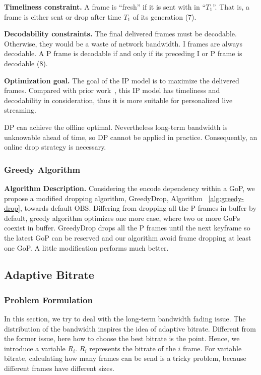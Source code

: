 \textbf{Timeliness constraint.}
A frame is ``fresh'' if it is sent with in ``$T_1$''. That is, a frame is either sent or drop after time $T_1$ of its generation (7).

\textbf{Decodability constraints.} The final delivered frames must be decodable. Otherwise, they would be a waste of network bandwidth. I frames are always decodable. A P frame is decodable if and only if its preceding I or P frame is decodable (8).

\textbf{Optimization goal.} The goal of the IP model is to maximize the delivered frames.
Compared with prior work~\cite{singh2004dynamic}, this IP model has timeliness and decodability in consideration, thus it is more suitable for personalized live streaming.

DP can achieve the offline optimal. Nevertheless long-term bandwidth is unknowable ahead of time, so DP cannot be applied in practice. Consequently, an online drop strategy is necessary.

\subsubsection{Greedy Algorithm}

\textbf{Algorithm Description.} Considering the encode dependency within a GoP, we propose a modified dropping algorithm, GreedyDrop, Algorithm ~\ref{alg:greedy-drop}, towards default OBS. Differing from dropping all the P frames in buffer by default, greedy algorithm optimizes one more case, where two or more GoPs coexist in buffer. GreedyDrop drops all the P frames until the next keyframe so the latest GoP can be reserved and our algorithm avoid frame dropping at least one GoP. A little modification performs much better.

\subsection{Adaptive Bitrate}
\subsubsection{Problem Formulation}


In this section, we try to deal with the long-term bandwidth fading issue. The distribution of the bandwidth inspires the idea of adaptive bitrate. Different from the former issue, here how to choose the best bitrate is the point. Hence, we introduce a variable $R_{i}$. $R_{i}$ represents the bitrate of the $i$ frame. For variable bitrate, calculating how many frames can be send is a tricky problem, because different frames have different sizes.

